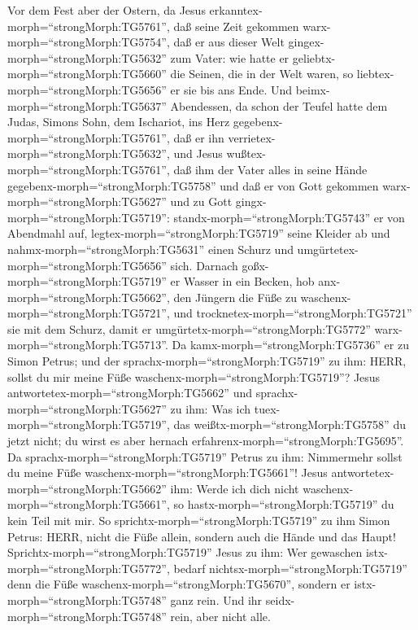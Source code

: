  Vor dem Fest aber der Ostern, da Jesus
erkanntex-morph=``strongMorph:TG5761'', daß seine Zeit gekommen
warx-morph=``strongMorph:TG5754'', daß er aus dieser Welt
gingex-morph=``strongMorph:TG5632'' zum Vater: wie hatte er
geliebtx-morph=``strongMorph:TG5660'' die Seinen, die in der Welt waren,
so liebtex-morph=``strongMorph:TG5656'' er sie bis ans Ende.
 Und beimx-morph=``strongMorph:TG5637'' Abendessen, da schon
der Teufel hatte dem Judas, Simons Sohn, dem Ischariot, ins Herz
gegebenx-morph=``strongMorph:TG5761'', daß er ihn
verrietex-morph=``strongMorph:TG5632'',  und Jesus
wußtex-morph=``strongMorph:TG5761'', daß ihm der Vater alles in seine
Hände gegebenx-morph=``strongMorph:TG5758'' und daß er von Gott gekommen
warx-morph=``strongMorph:TG5627'' und zu Gott
gingx-morph=``strongMorph:TG5719'': 
standx-morph=``strongMorph:TG5743'' er von Abendmahl auf,
legtex-morph=``strongMorph:TG5719'' seine Kleider ab und
nahmx-morph=``strongMorph:TG5631'' einen Schurz und
umgürtetex-morph=``strongMorph:TG5656'' sich.  Darnach
goßx-morph=``strongMorph:TG5719'' er Wasser in ein Becken, hob
anx-morph=``strongMorph:TG5662'', den Jüngern die Füße zu
waschenx-morph=``strongMorph:TG5721'', und
trocknetex-morph=``strongMorph:TG5721'' sie mit dem Schurz, damit er
umgürtetx-morph=``strongMorph:TG5772''
warx-morph=``strongMorph:TG5713''.  Da
kamx-morph=``strongMorph:TG5736'' er zu Simon Petrus; und der
sprachx-morph=``strongMorph:TG5719'' zu ihm: HERR, sollst du mir meine
Füße waschenx-morph=``strongMorph:TG5719''?  Jesus
antwortetex-morph=``strongMorph:TG5662'' und
sprachx-morph=``strongMorph:TG5627'' zu ihm: Was ich
tuex-morph=``strongMorph:TG5719'', das
weißtx-morph=``strongMorph:TG5758'' du jetzt nicht; du wirst es aber
hernach erfahrenx-morph=``strongMorph:TG5695''.  Da
sprachx-morph=``strongMorph:TG5719'' Petrus zu ihm: Nimmermehr sollst du
meine Füße waschenx-morph=``strongMorph:TG5661''! Jesus
antwortetex-morph=``strongMorph:TG5662'' ihm: Werde ich dich nicht
waschenx-morph=``strongMorph:TG5661'', so
hastx-morph=``strongMorph:TG5719'' du kein Teil mit mir.  So
sprichtx-morph=``strongMorph:TG5719'' zu ihm Simon Petrus: HERR, nicht
die Füße allein, sondern auch die Hände und das Haupt! 
Sprichtx-morph=``strongMorph:TG5719'' Jesus zu ihm: Wer gewaschen
istx-morph=``strongMorph:TG5772'', bedarf
nichtsx-morph=``strongMorph:TG5719'' denn die Füße
waschenx-morph=``strongMorph:TG5670'', sondern er
istx-morph=``strongMorph:TG5748'' ganz rein. Und ihr
seidx-morph=``strongMorph:TG5748'' rein, aber nicht alle. 
